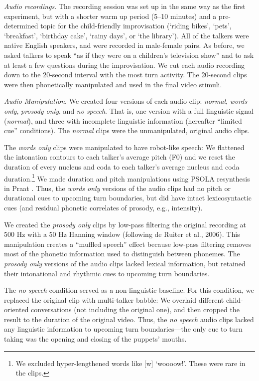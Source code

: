 \documentclass[authoryear, 12pt]{elsarticle}
\begin{document}
\textit{Audio recordings}. The recording session was set up in the same way as the first experiment, but with a shorter warm up period (5--10 minutes) and a pre-determined topic for the child-friendly improvisation (`riding bikes', `pets', `breakfast', `birthday cake', `rainy days', or `the library'). All of the talkers were native English speakers, and were recorded in male-female pairs. As before, we asked talkers to speak ``as if they were on a children's television show'' and to ask at least a few questions during the improvisation. We cut each audio recording down to the 20-second interval with the most turn activity. The 20-second clips were then phonetically manipulated and used in the final video stimuli.

\textit{Audio Manipulation}. We created four versions of each audio clip: \textit{normal}, \textit{words only}, \textit{prosody only}, and \textit{no speech}. That is, one version with a full linguistic signal (\textit{normal}), and three with incomplete linguistic information (hereafter ``limited cue'' conditions). The \textit{normal} clips were the unmanipulated, original audio clips. 

The \textit{words only} clips were manipulated to have robot-like speech: We flattened the intonation contours to each talker's average pitch (F0) and we reset the duration of every nucleus and coda to each talker's average nucleus and coda duration.\footnote{We excluded hyper-lengthened words like [w] `woooow!'. These were rare in the clips.} We made duration and pitch manipulations using PSOLA resynthesis in Praat \citep{Praat}. Thus, the \textit{words only} versions of the audio clips had no pitch or durational cues to upcoming turn boundaries, but did have intact lexicosyntactic cues (and residual phonetic correlates of prosody, e.g., intensity). 

We created the \textit{prosody only} clips by low-pass filtering the original recording at 500 Hz with a 50 Hz Hanning window (following de Ruiter et al., 2006). This manipulation creates a ``muffled speech'' effect because low-pass filtering removes most of the phonetic information used to distinguish between phonemes. The \textit{prosody only} versions of the audio clips lacked lexical information, but retained their intonational and rhythmic cues to upcoming turn boundaries. 

The \textit{no speech} condition served as a non-linguistic baseline. For this condition, we replaced the original clip with multi-talker babble: We overlaid different child-oriented conversations (not including the original one), and then cropped the result to the duration of the original video. Thus, the \textit{no speech} audio clips lacked any linguistic information to upcoming turn boundaries---the only cue to turn taking was the opening and closing of the puppets' mouths. 
\end{document}
